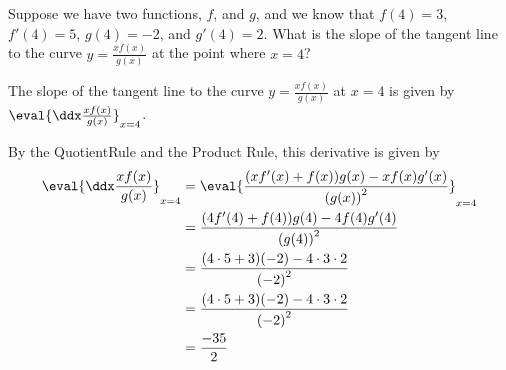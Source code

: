 \documentclass{ximera}
\begin{document}
\begin{example}
  Suppose we have two functions, $f$, and $g$, and we know that $f(4) = 3$, $f'(4) = 5$, $g(4) = -2$, and $g'(4) = 2$.
  What is the slope of the tangent line to the curve $y=\frac{xf(x)}{g(x)}$ at the point where $x = 4$?
  \begin{explanation}
  	 The slope of the tangent line to the curve  $y=\frac{xf(x)}{g(x)}$ at $x = 4$ is given by $ \eval{\ddx\frac{xf(x)}{g(x)}}_{x=4}$.
	 
	  By the QuotientRule and the Product Rule, this derivative is given by 
	 \begin{align*}
\eval{\ddx\frac{xf(x)}{g(x)}}_{x=4} &=\eval{\frac{(xf'(x)+f(x))g(x)-xf(x)g'(x)}{\left(g(x)\right)^2}}_{x=4}\\
&=\frac{(4f'(4)+f(4))g(4)-4f(4)g'(4)}{\left(g(4)\right)^2}\\
&=\frac{(4\cdot5+3)(-2)-4\cdot3\cdot2}{\left(-2\right)^2}\\
&=\frac{(4\cdot5+3)(-2)-4\cdot3\cdot2}{\left(-2\right)^2}\\
&=\frac{-35}{2}\\
\end{align*}
	   \end{explanation}
\end{example} 
\end{document}
